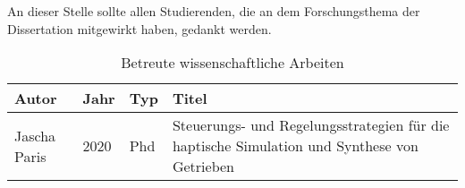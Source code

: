 
\label{sec:WissArbeiten}

An dieser Stelle sollte allen Studierenden, die an dem Forschungsthema der Dissertation mitgewirkt haben, gedankt werden.

\begin{table}[h]
	\centering
	\caption{Betreute wissenschaftliche Arbeiten}
	\label{tab:BetreuteWissenschaftlicheArbeiten}
	\begin{tabular}{lll>{\raggedright\arraybackslash}p{9cm}}
		\toprule
		Autor            & Jahr & Typ   & Titel                                                                                                                                                                              \\ \midrule
		Jascha Paris     & 2020 & Phd & Steuerungs- und Regelungsstrategien für die haptische Simulation und Synthese von Getrieben \\
		\bottomrule
	\end{tabular}
\end{table}
